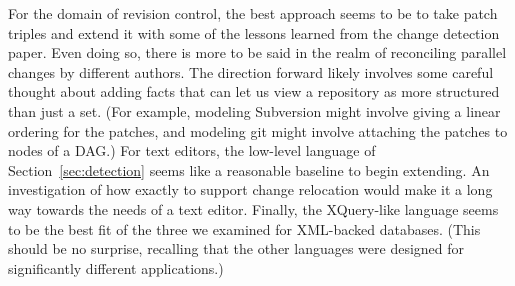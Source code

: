 \documentclass{article}
\newif\ifhighlightnew\highlightnewfalse
\newenvironment{newcontent}{\ifhighlightnew\color{green!55!black}[new]\fi}{\ifhighlightnew\color{black}\fi}
\begin{document}
\begin{newcontent}
For the domain of revision control, the best approach seems to be to take
patch triples and extend it with some of the lessons learned from the change
detection paper. Even doing so, there is more to be said in the realm of
reconciling parallel changes by different authors. The direction forward
likely involves some careful thought about adding facts that can let us view
a repository as more structured than just a set. (For example, modeling
Subversion might involve giving a linear ordering for the patches, and
modeling git might involve attaching the patches to nodes of a DAG.) For
text editors, the low-level language of Section~\ref{sec:detection} seems
like a reasonable baseline to begin extending. An investigation of how
exactly to support change relocation would make it a long way towards the
needs of a text editor.  Finally, the XQuery-like language seems to be the
best fit of the three we examined for XML-backed databases. (This should be
no surprise, recalling that the other languages were designed for
significantly different applications.)
\end{newcontent}



\end{document}
